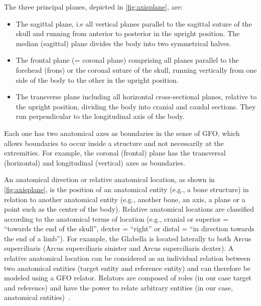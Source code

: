 \documentclass[sw]{iosart2x}
\begin{document}
The three principal planes, depicted in \cref{fig:axisplane}, are:
\begin{itemize}
\item The sagittal plane, i.e all vertical planes parallel to the sagittal suture of the skull and running from anterior to posterior in the upright position.
The median (sagittal) plane divides the body into two symmetrical halves.
\item The frontal plane (= coronal plane) comprising all planes parallel to the forehead (frons) or the coronal suture of the skull, running vertically from one side of the body to the other in the upright position.
\item The transverse plane including all horizontal cross-sectional planes, relative to the upright position, dividing the body into cranial and caudal sections.
They run perpendicular to the longitudinal axis of the body.
\end{itemize}

Each one has two anatomical axes as boundaries in the sense of GFO, which allows boundaries to occur inside a structure and not necessarily at the extremities.
For example, the coronal (frontal) plane has the transversal (horizontal) and longitudinal (vertical) axes as boundaries.

An anatomical direction or relative anatomical location, as shown in \cref{fig:axisplane}, is the position of an anatomical entity (e.g., a bone structure) in relation to another anatomical entity (e.g., another bone, an axis, a plane or a point such as the center of the body).
Relative anatomical locations are classified according to the anatomical terms of location (e.g., cranial or superior = \enquote{towards the end of the skull}, dexter = \enquote{right} or distal = \enquote{in direction towards the end of a limb}).
For example, the Glabella is located laterally to both Arcus superciliaris (Arcus superciliaris sinister and Arcus superciliaris dexter).
A relative anatomical location can be considered as an individual relation between two anatomical entities (target entity and reference entity) and can therefore be modeled using a GFO relator.
Relators are composed of roles (in our case target and reference) and have the power to relate arbitrary entities (in our case, anatomical entities)~\citep{gfocategory}.
\end{document}

